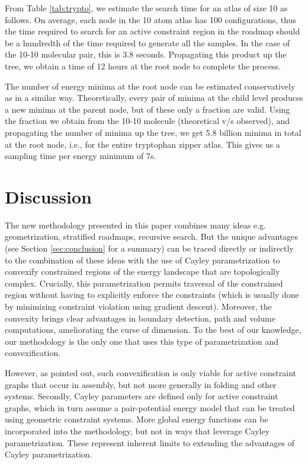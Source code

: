 \documentclass[]{article}
\begin{document}
From Table \ref{tab:trypto}, we estimate the search time for an atlas of
size 10 as follows. On average, each node in the 10 atom atlas has 100
configurations, thus the time required to search for an active constraint
region in the roadmap should be a hundredth of the time required to generate all the samples.
In the case of the 10-10 molecular pair, this is 3.8 seconds. 
Propagating this product up the tree, we obtain a time of 12 hours at the root
node to complete the process.

The number of energy minima at the root node can be estimated conservatively as in a similar
way. Theoretically, every pair of minima at the child level produces a new
minima at the parent node, but of these only a fraction are valid.
Using the fraction we obtain from the 10-10 molecule (theoretical v/s
observed), and propagating the number of minima up the tree, we get 5.8 billion
minima in total at the root node, i.e., for the entire tryptophan zipper atlas. 
This gives us a sampling time per energy minimum of 7s.
 \section{Discussion}
\label{sec:discussion}
The new methodology presented in this paper combines many ideas e.g.
geometrization, stratified roadmaps, recursive search. But the unique
advantages (see Section \ref{sec:conclusion} for a summary) can be traced
directly or indirectly to the combination of these ideas with the use of Cayley
parametrization to convexify constrained regions of the energy landscape that
are topologically complex. Crucially, this parametrization permits traversal of
the constrained region without having to explicitly enforce the constraints
(which is usually done by minimizing constraint violation using gradient
descent). Moreover, the convexity brings clear advantages in boundary
detection, path and volume computations, ameliorating the curse of dimension.
To the best of our knowledge, our methodology is the only one that uses this
type of parametrization and convexification.

However, as pointed out, such convexification is only viable for active
constraint graphs that occur in assembly, but not more generally in folding and
other systems. Secondly, Cayley parameters are defined only for active
constraint graphs, which in turn assume a pair-potential energy model that can
be treated using geometric constraint systems. More global energy functions can
be incorporated into the methodology, but not in ways that leverage Cayley
parametrization.  These represent inherent limits to extending the advantages
of Cayley parametrization.
\end{document}
